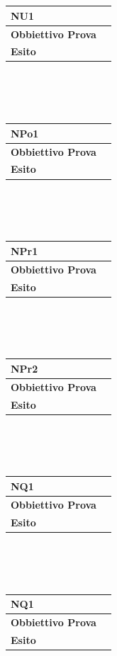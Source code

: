 \documentclass[11pt,titlepage,a4paper]{report}
\begin{document}
\\
\\
\begin{tabular}{||p{4.5cm}||p{7.5cm}||}
\hline
\textbf{\textsf{NU1}} \\
\hline
{\textbf {Obbiettivo Prova}}& \\ \hline
{\textbf{Esito}}&  \\ \hline
\end{tabular} \\
\\
\\
\begin{tabular}{||p{4.5cm}||p{7.5cm}||}
\hline
\textbf{\textsf{NPo1}} \\
\hline
{\textbf {Obbiettivo Prova}}& \\ \hline
{\textbf{Esito}}&  \\ \hline
\end{tabular} \\
\\
\\
\begin{tabular}{||p{4.5cm}||p{7.5cm}||}
\hline
\textbf{\textsf{NPr1}} \\
\hline
{\textbf {Obbiettivo Prova}}& \\ \hline
{\textbf{Esito}}&  \\ \hline
\end{tabular} \\
\\
\\
\begin{tabular}{||p{4.5cm}||p{7.5cm}||}
\hline
\textbf{\textsf{NPr2}} \\
\hline
{\textbf {Obbiettivo Prova}}& \\ \hline
{\textbf{Esito}}&  \\ \hline
\end{tabular} \\
\\
\\
\begin{tabular}{||p{4.5cm}||p{7.5cm}||}
\hline
\textbf{\textsf{NQ1}} \\
\hline
{\textbf {Obbiettivo Prova}}& \\ \hline
{\textbf{Esito}}&  \\ \hline
\end{tabular} \\
\\
\\
\begin{tabular}{||p{4.5cm}||p{7.5cm}||}
\hline
\textbf{\textsf{NQ1}} \\
\hline
{\textbf {Obbiettivo Prova}}& \\ \hline
{\textbf{Esito}}&  \\ \hline
\end{tabular} \\
\end{document}
